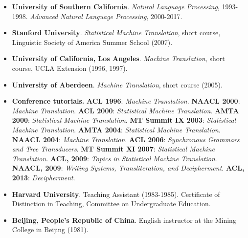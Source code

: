 \begin{itemize}

\item {\bf University of Southern California}.  {\em Natural Language
Processing}, 1993-1998.  {\em Advanced Natural Language Processing}, 2000-2017.

\item {\bf Stanford University}.  {\em Statistical Machine Translation}, 
short course, Linguistic Society of America Summer School (2007).

\item {\bf University of California, Los Angeles}.  {\em Machine Translation}, 
short course, UCLA Extension (1996, 1997).

\item {\bf University of Aberdeen}. {\em Machine Translation},
short course (2005).

\item {\bf Conference tutorials.}
{\bf ACL 1996}:
{\em Machine Translation}. 
{\bf NAACL 2000}: 
{\em Machine Translation}.
{\bf ACL 2000}:  
{\em Statistical Machine Translation}.
{\bf AMTA 2000}:  
{\em Statistical Machine Translation}.
{\bf MT Summit IX 2003}:
{\em Statistical Machine Translation}.
{\bf AMTA 2004}:  
{\em Statistical Machine Translation}.
{\bf NAACL 2004}:  
{\em Machine Translation}.
{\bf ACL 2006}:
{\em Synchronous Grammars and Tree Transducers}.
{\bf MT Summit XI 2007}:
{\em Statistical Machine Translation}.
{\bf ACL, 2009}:
{\em Topics in Statistical Machine Translation}.
{\bf NAACL, 2009}:
{\em Writing Systems, Transliteration, and Decipherment}.
{\bf ACL, 2013}:
{\em Decipherment}.


\item {\bf Harvard University}.  Teaching Assistant (1983-1985).  
Certificate of 
Distinction in Teaching, Committee on Undergraduate Education. 

\item {\bf Beijing, People's Republic of China}.  English instructor at the
Mining College in Beijing (1981).  
\end{itemize}


